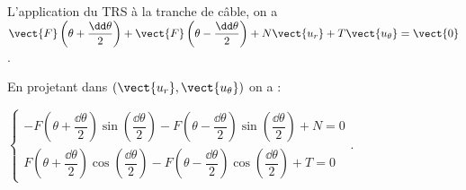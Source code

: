 \ifprof
\begin{corrige}
L'application du TRS à la tranche de câble, on a $\vect{F}\left(\theta+\dfrac{\dd \theta}{2}\right) + \vect{F}\left(\theta-\dfrac{\dd \theta}{2}\right) + N\vect{u_r}+T\vect{u_{\theta}} = \vect{0}$.

En projetant dans $\left( \vect{u_r}, \vect{u_{\theta}}\right)$ on a :
 
$\left\{ 
\begin{array}{l}
-F\left(\theta+\dfrac{\dd \theta}{2}\right)  \sin\left(\dfrac{\dd \theta}{2}\right)  -F\left(\theta-\dfrac{\dd \theta}{2}\right) \sin\left(\dfrac{\dd \theta}{2}\right) + N= 0 \\
F\left(\theta+\dfrac{\dd \theta}{2}\right) \cos\left(\dfrac{\dd \theta}{2}\right) -F\left(\theta-\dfrac{\dd \theta}{2}\right) \cos\left(\dfrac{\dd \theta}{2}\right) + T = 0
\end{array}
\right.$.

\end{corrige}
\else
\fi


